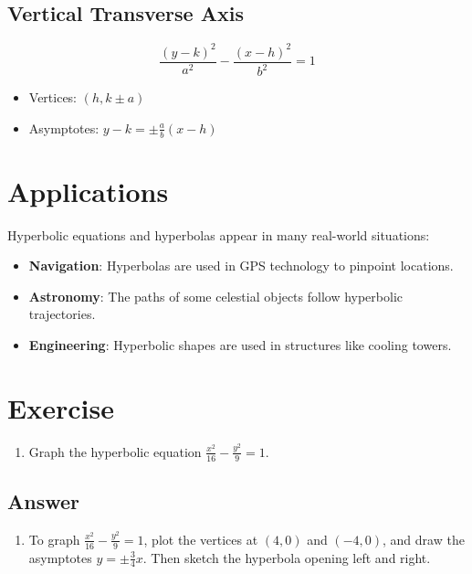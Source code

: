 \documentclass[12pt]{article}
\begin{document}
\subsection*{Vertical Transverse Axis}
\[
\frac{(y - k)^2}{a^2} - \frac{(x - h)^2}{b^2} = 1
\]
\begin{itemize}
    \item Vertices: \((h, k \pm a)\)
    \item Asymptotes: \( y - k = \pm \frac{a}{b}(x - h) \)
\end{itemize}

\newpage

\section*{Applications}
Hyperbolic equations and hyperbolas appear in many real-world situations:
\begin{itemize}
    \item \textbf{Navigation}: Hyperbolas are used in GPS technology to pinpoint locations.
    \item \textbf{Astronomy}: The paths of some celestial objects follow hyperbolic trajectories.
    \item \textbf{Engineering}: Hyperbolic shapes are used in structures like cooling towers.
\end{itemize}

\section*{Exercise}
\begin{enumerate}
    \item Graph the hyperbolic equation \(\frac{x^2}{16} - \frac{y^2}{9} = 1\).
\end{enumerate}

\subsection*{Answer}
\begin{enumerate}
    \item To graph \(\frac{x^2}{16} - \frac{y^2}{9} = 1\), plot the vertices at \((4, 0)\) and \((-4, 0)\), and draw the asymptotes \(y = \pm \frac{3}{4}x\). Then sketch the hyperbola opening left and right.
\end{enumerate}
\end{document}
